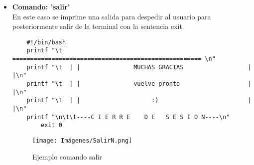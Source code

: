 \documentclass[letterpaper,12pt]{article} %
\begin{document}
\begin{itemize}
     \begin{lstlisting}
      #!/bin/bash
# ==-==-==-==-> Solamente son colores
R='\033[1;31m' # Rojo
G='\033[1;32m' # Verde
Y='\033[1;33m' # Amarillo
B='\033[1;34m' # Azul
M='\033[1;35m' # Mangenta
W='\033[0m' # Blanco
Glig='\e[1;32m' # Verde claro
#Pide los parametros

printf "${Glig}Ingrese la ruta absoluta del archivo${W}:"

read -r directorio

printf "${Glig}Ingrese el nombre del archivo con su extension${W}:"

read -r archivo

cd $directorio

# Realiza la busqueda del archivo en el directorio especificado
resultado=$(find -type f -name "$archivo")

if [ -n "$resultado" ]; then
    printf "Archivo encontrado: $R $resultado ${W} en ${M} $directorio ${W}\n"
else
    printf "Archivo ${R}'$archivo'${W} no encontrado en el directorio ${M}'$directorio'${W}\n"
fi  
     \end{lstlisting}
\begin{figure}[H]
\caption{Ejemplo comando buscar}
\centering
\texttt{[image: Imágenes/buscar.png]}
\end{figure}
     \item \textbf{Comando: 'salir'}\\
     En este caso se imprime una salida para despedir al usuario para posteriormente salir de la terminal con la sentencia exit.
    \begin{lstlisting}
    #!/bin/bash
	printf "\t  ===================================================== \n"
	printf "\t  | |               MUCHAS GRACIAS                  | |\n"
	printf "\t  | |               vuelve pronto                   | |\n"
	printf "\t  | |                    :)                         | |\n"
	printf "\n\t\t----C I E R R E    D E   S E S I O N----\n"
        exit 0

    \end{lstlisting}

    \begin{figure}[H]
\caption{Ejemplo comando salir}
\centering
\texttt{[image: Imágenes/SalirN.png]}
\end{figure}
\end{itemize}
\newpage
\end{document}
